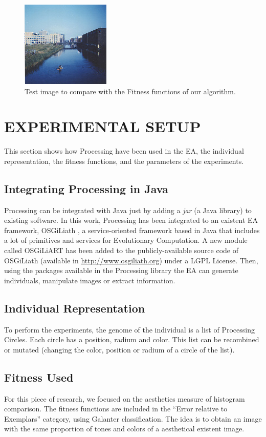 \documentclass[a4paper,twoside]{article}
\begin{document}
\begin{figure}
\centering
   \includegraphics[scale =3] {images/flevopark.eps}
\caption{Test image to compare with the Fitness functions of our algorithm.}
\label{fig:flevopark}
\end{figure}

\section{EXPERIMENTAL SETUP}
\label{sec:setup}

\noindent This section shows how Processing have been used in the EA, the individual representation, the fitness functions, and the parameters of the experiments.

\subsection{Integrating Processing in Java}
Processing can be integrated with Java just by adding a {\em jar} (a Java library) to existing software. In this work, Processing has been integrated to an existent EA framework, OSGiLiath \cite{OSGILIATH}, a service-oriented framework based in Java that includes a lot of primitives and services for Evolutionary Computation. A new module called OSGiLiART has been added to the publicly-available source code of OSGiLiath (available in \url{http://www.osgiliath.org}) under a LGPL License. Then, using the packages available in the Processing library the EA can generate individuals, manipulate images or extract information.

\subsection{Individual Representation}

To perform the experiments, the genome of the individual is a list of Processing Circles. Each circle has a position, radium and color. This list can be recombined or mutated (changing the color, position or radium of a circle of the list).

\subsection{Fitness Used}
For this piece of research, we focused on the aesthetics measure of histogram comparison. The fitness functions are included in the ``Error relative to Exemplars'' category, using Galanter \cite{galanter2012computational} classification. The idea is to obtain an image with the same proportion of tones and colors of a aesthetical existent image.
\end{document}
